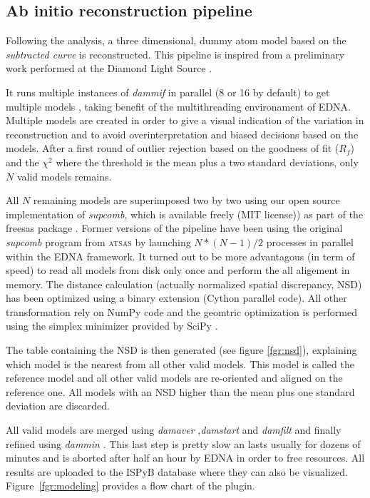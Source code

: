 \documentclass[preprint,pdf]{iucr}              %
\begin{document}
\subsection{Ab initio reconstruction pipeline}
\label{abinitio}
Following the analysis, a three dimensional, dummy atom model based
on the \textit{subtracted curve} is reconstructed.
This pipeline is inspired from a preliminary work
performed at the Diamond Light Source \cite{DiamondSE}.

It runs multiple instances of \textit{dammif} in parallel (8 or 16 by default)
to get multiple models \cite{dammif}, taking benefit of the multithreading
environament of EDNA.
Multiple models are created in order to give a visual indication of the variation in 
reconstruction and to avoid overinterpretation and biased decisions based on the models.
After a first round of outlier rejection based on the goodness of fit ($R_{f}$)
and the $\chi^{2}$ where the threshold is the mean plus a two standard
deviations, only $N$ valid models remains.

All $N$ remaining models are superimposed two by two using
our open source implementation of \textit{supcomb}, which is available freely
(MIT license)) as part of the freesas package \cite{freesas}.  
Former versions of the pipeline have been using the original 
\textit{supcomb} \cite{supcomb} program from \textsc{atsas} by launching
$N*(N-1)/2$ processes in parallel within the EDNA framework. 
It turned out to be more advantagous (in term of speed) to read all models 
from disk only once and
perform the all aligement in memory. 
The distance calculation (actually normalized spatial discrepancy, NSD) has
been optimized using a binary extension (Cython parallel code). 
All other transformation rely on NumPy \cite{numpy} code and the geomtric optimization is
performed using the simplex minimizer provided by SciPy \cite{scipy}.

The table containing the NSD is then generated
(see figure \ref{fgr:nsd}), explaining which model is the nearest from all other
valid models. This model is called the reference model and all other valid
models are re-oriented and aligned on the reference one. 
All models with an NSD higher than the mean plus one standard deviation are
discarded.

All valid models are merged using \textit{damaver} \cite{damaver},\textit{damstart} and
\textit{damfilt} and finally refined using \textit{dammin} \cite{dammin}.
This last step is pretty slow an lasts usually for dozens of minutes and is
aborted after half an hour by EDNA in order to free resources. 
All results are uploaded to the ISPyB database where they can also be
visualized. Figure~\ref{fgr:modeling} provides a flow chart of the plugin.
\end{document}

